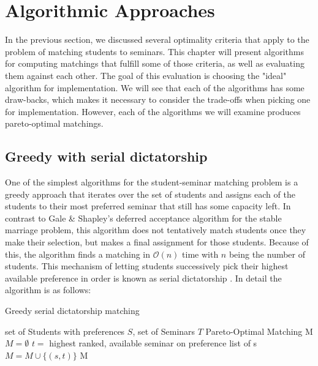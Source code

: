 \section{Algorithmic Approaches}\label{chapter:algorithms}
In the previous section, we discussed several optimality criteria that apply to the problem of matching students to seminars. This chapter will present algorithms for computing matchings that fulfill some of those criteria, as well as evaluating them against each other. The goal of this evaluation is choosing the "ideal" algorithm for implementation. We will see that each of the algorithms has some draw-backs, which makes it necessary to consider the trade-offs when picking one for implementation. However, each of the algorithms we will examine produces pareto-optimal matchings. 

\subsection{Greedy with serial dictatorship}\label{algo-rsd}
One of the simplest algorithms for the student-seminar matching problem is a greedy approach that iterates over the set of students and assigns each of the students to their most preferred seminar that still has some capacity left. In contrast to Gale \& Shapley's deferred acceptance algorithm for the stable marriage problem, this algorithm does not tentatively match students once they make their selection, but makes a final assignment for those students. Because of this, the algorithm finds a matching in $\mathcal{O}(n)$ time with $n$ being the number of students. This mechanism of letting students successively pick their highest available preference in order is known as serial dictatorship \cite{MANEA2007316}. In detail the algorithm is as follows: 

\begin{algorithm} %
    \caption{Greedy serial dictatorship matching} 
    \label{alg1} %
    \begin{algorithmic} %
        \Require set of Students with preferences $S$, set of Seminars $T$
        \Ensure Pareto-Optimal Matching M
        \State $M = \emptyset$
            \State $t =$ highest ranked, available seminar on preference list of s
                \State $M = M \cup \{(s, t)\}$
            \EndIf
        \EndFor
        \State\Return M
        \EndFunction
    \end{algorithmic}
\end{algorithm}

